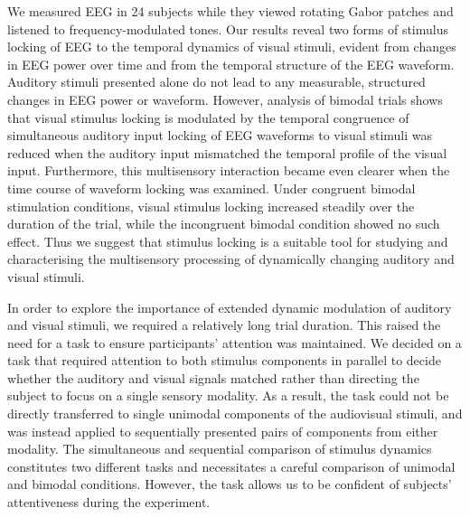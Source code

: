 

We measured EEG in 24 subjects while they viewed rotating Gabor patches and
listened to frequency-modulated tones. Our results reveal two forms of
stimulus locking of EEG to the temporal dynamics of visual stimuli, evident
from changes in EEG power over time and from the temporal structure of the
EEG waveform. Auditory stimuli presented alone do not lead to any
measurable, structured changes in EEG power or waveform. However, analysis
of bimodal trials shows that visual stimulus locking is modulated by the
temporal congruence of simultaneous auditory input \textemdash locking of
EEG waveforms to visual stimuli was reduced when the auditory input
mismatched the temporal profile of the visual input. Furthermore, this
multisensory interaction became even clearer when the time course of
waveform locking was examined. Under congruent bimodal stimulation
conditions, visual stimulus locking increased steadily over the duration of
the trial, while the incongruent bimodal condition showed no such effect.
Thus we suggest that stimulus locking is a suitable tool for studying and
characterising the multisensory processing of dynamically changing auditory
and visual stimuli.



In order to explore the importance of extended dynamic modulation of
auditory and visual stimuli, we required a relatively long trial duration.
This raised the need for a task to ensure participants' attention was
maintained. We decided on a task that required attention to both stimulus
components in parallel \textemdash to decide whether the auditory and
visual signals matched \textemdash rather than directing the subject to
focus on a single sensory modality. As a result, the task could not be
directly transferred to single unimodal components of the audiovisual
stimuli, and was instead applied to sequentially presented pairs of
components from either modality.  The simultaneous and sequential
comparison of stimulus dynamics constitutes two different tasks and
necessitates a careful comparison of unimodal and bimodal conditions.
However, the task allows us to be confident of subjects' attentiveness
during the experiment.



